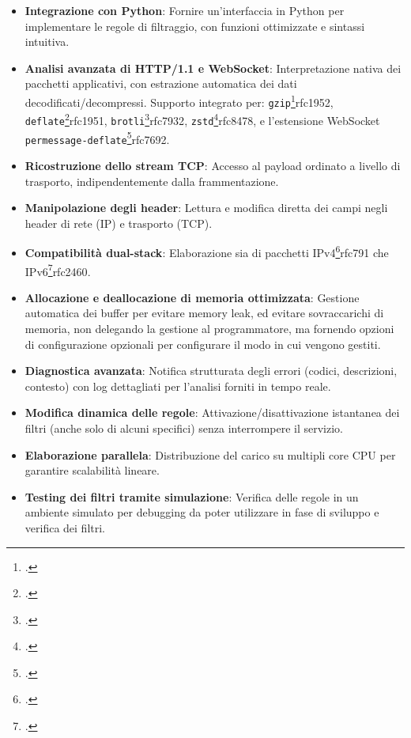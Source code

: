 \begin{itemize}
    \setlength{\itemsep}{4pt}
    \setlength{\parskip}{4pt}
    
    \item \textbf{Integrazione con Python}: Fornire un'interfaccia in Python per implementare le regole di filtraggio, con funzioni ottimizzate e sintassi intuitiva.
    
    \item \textbf{Analisi avanzata di HTTP/1.1 e WebSocket}: Interpretazione nativa dei pacchetti applicativi, con estrazione automatica dei dati decodificati/decompressi. Supporto integrato per:
    \texttt{gzip}\footcite{RFC1952, GZIP file format specification version 4.3}{rfc1952},
    \texttt{deflate}\footcite{RFC1951, DEFLATE Compressed Data Format Specification version 1.3}{rfc1951},
    \texttt{brotli}\footcite{RFC7932, Brotli Compressed Data Format}{rfc7932},
    \texttt{zstd}\footcite{RFC8478, Zstandard Compression and the application/zstd Media Type}{rfc8478}, 
    e l'estensione WebSocket \texttt{permessage-deflate}\footcite{RFC7692, Compression Extensions for WebSocket}{rfc7692}.
    
    \item \textbf{Ricostruzione dello stream TCP}: Accesso al payload ordinato a livello di trasporto, indipendentemente dalla frammentazione.
    
    \item \textbf{Manipolazione degli header}: Lettura e modifica diretta dei campi negli header di rete (IP) e trasporto (TCP).
    
    \item \textbf{Compatibilità dual-stack}: Elaborazione sia di pacchetti IPv4\footcite{RFC791, Internet Protocol}{rfc791} che IPv6\footcite{RFC2460, Internet Protocol, Version 6 (IPv6) Specification}{rfc2460}.
    
    \item \textbf{Allocazione e deallocazione di memoria ottimizzata}: Gestione automatica dei buffer per evitare memory leak, ed evitare sovraccarichi di memoria, non delegando la gestione al programmatore, ma fornendo opzioni di configurazione opzionali per configurare il modo in cui vengono gestiti.
    
    \item \textbf{Diagnostica avanzata}: Notifica strutturata degli errori (codici, descrizioni, contesto) con log dettagliati per l'analisi forniti in tempo reale.
    
    \item \textbf{Modifica dinamica delle regole}: Attivazione/disattivazione istantanea dei filtri (anche solo di alcuni specifici) senza interrompere il servizio.
    
    \item \textbf{Elaborazione parallela}: Distribuzione del carico su multipli core CPU per garantire scalabilità lineare.
    
    \item \textbf{Testing dei filtri tramite simulazione}: Verifica delle regole in un ambiente simulato per debugging da poter utilizzare in fase di sviluppo e verifica dei filtri.
\end{itemize}

